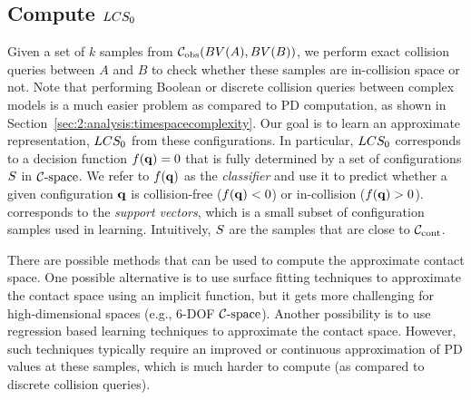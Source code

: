 \subsection{Compute $LCS_0$} \label{sec:2:offline:model}
Given a set of $k$ samples from
$\mathcal C_{\text{obs}}(BV(A),BV(B))$, we perform exact collision queries between $A$ and $B$  to
check whether these samples are in-collision space or not. Note that performing Boolean or discrete collision queries between complex models is a much easier problem as compared to PD computation, as shown in Section~\ref{sec:2:analysis:timespacecomplexity}.
Our goal is to learn an approximate representation, $LCS_0$ from these
configurations. In particular, $LCS_0$ corresponds to a decision function
$f(\mathbf q)=0$ that is fully determined by a set of configurations $S$
in $\mathcal C\text{-space}$. We refer to $f(\mathbf q)$ as the \emph{classifier} and use it to
predict whether a given configuration $\mathbf q$ is collision-free
($f(\mathbf q)<0$) or in-collision ($f(\mathbf q)>0$). \SV corresponds to the \emph{support vectors}, which is a
small subset of configuration samples used in learning.
Intuitively, $S$ are the samples that are close to $\mathcal C_\text{cont}$.

There are possible methods that can be used to compute the approximate contact space.
One possible alternative is to use surface fitting techniques to approximate the contact space using an implicit function, but it gets more challenging for high-dimensional spaces (e.g., 6-DOF $\mathcal C\text{-space}$). Another possibility is to use regression based learning techniques to approximate the contact space. However, such techniques typically require an improved or continuous approximation of PD values at these samples, which is much harder to compute (as compared to discrete collision queries).

